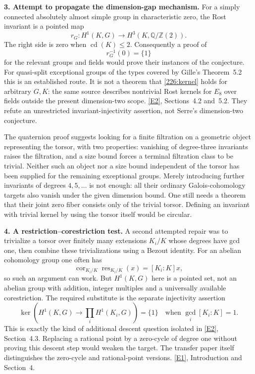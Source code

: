 \documentclass[11pt,a4paper]{article}
\newcommand{\Z}{\mathbb{Z}}
\newcommand{\Q}{\mathbb{Q}}
\newcommand{\eref}[2]{\hyperlink{extra:#1:#2}{[E#2]}}
\numberwithin{equation}{section}
\begin{document}
\textbf{3. Attempt to propagate the dimension-gap mechanism.}
For a simply connected absolutely almost simple group in characteristic
zero, the Rost invariant is a pointed map
\[
 r_G:H^1(K,G)\longrightarrow H^3(K,\Q/\Z(2)).
\]
The right side is zero when $\operatorname{cd}(K)\le2$.
Consequently a proof of
\begin{equation}\label{226:kernel}
 r_G^{-1}(0)=\{1\}
\end{equation}
for the relevant groups and fields would prove their instances of the
conjecture. For quasi-split exceptional groups of the types covered by
Gille's Theorem~5.2 this is an established route. It is not a theorem
that \eqref{226:kernel} holds for arbitrary $G,K$: the same source
describes nontrivial Rost kernels for $E_8$ over fields outside the
present dimension-two scope. \eref{226}{2}, Sections~4.2 and~5.2.
They refute an unrestricted invariant-injectivity assertion, not
Serre's dimension-two conjecture.

The quaternion proof suggests looking for a finite filtration on a
geometric object representing the torsor, with two properties: vanishing
of degree-three invariants raises the filtration, and a size bound
forces a terminal filtration class to be trivial. Neither such an
object nor a size bound independent of the torsor has been supplied
for the remaining exceptional groups. Merely introducing further
invariants of degrees $4,5,\ldots$ is not enough: all their ordinary
Galois-cohomology targets also vanish under the given dimension bound.
One still needs a theorem that their joint zero fiber consists only of
the trivial torsor. Defining an invariant with trivial kernel by using
the torsor itself would be circular.

\textbf{4. A restriction--corestriction test.}
A second attempted repair was to trivialize a torsor over finitely many
extensions $K_i/K$ whose degrees have gcd one, then combine these
trivializations using a Bezout identity. For an abelian cohomology group
one often has
\[
 \operatorname{cor}_{K_i/K}\operatorname{res}_{K_i/K}(x)
          =[K_i:K]x,
\]
so such an argument can work. But $H^1(K,G)$ here is a pointed set,
not an abelian group with addition, integer multiples and a universally
available corestriction. The required substitute is the separate
injectivity assertion
\[
 \ker\left(H^1(K,G)\to\prod_i H^1(K_i,G)\right)=\{1\}
        \quad\text{when }\gcd_i[K_i:K]=1.
\]
This is exactly the kind of additional descent question isolated in
\eref{226}{2}, Section~4.3. Replacing a rational point by a zero-cycle
of degree one without proving this descent step would weaken the target.
The transfer paper itself distinguishes the zero-cycle and rational-point
versions. \eref{226}{1}, Introduction and Section~4.
\end{document}
